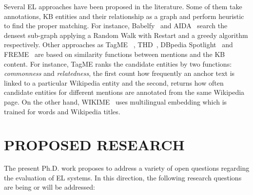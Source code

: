 \documentclass[sigconf]{acmart}
\begin{document}
Several EL approaches have been proposed in the literature. Some of them take annotations, KB entities and their relationship as a graph and perform heuristic to find the proper matching. For instance, Babelfy~\cite{0001RN14} and AIDA~\cite{HoffartYBFPSTTW11} search the densest sub-graph applying a Random Walk with Restart and a greedy algorithm respectively. Other approaches as TagME~\cite{FerraginaS10} , THD~\cite{DojchinovskiK13}, DBpedia Spotlight~\cite{MendesJGB11} and FREME~\cite{SasakiDN16} are based on similarity functions between mentions and the KB content. For instance, TagME ranks the candidate entities by two functions: \textit{commonness} and \textit{relatedness}, the first count how frequently an anchor text is linked to a particular Wikipedia entity and the second, returns how often candidate entities for different mentions are annotated from the same Wikipedia page. On the other hand, WIKIME~\cite{TsaiR16} uses multilingual embedding which is trained for words and Wikipedia titles. 

\section{PROPOSED RESEARCH}

The present Ph.D. work proposes to address a variety of open questions regarding the evaluation of EL systems. In this direction, the following research questions are being or will be addressed:
\end{document}
